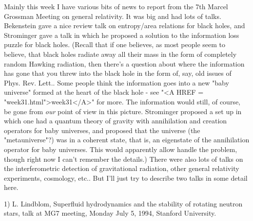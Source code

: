 

Mainly this week I have various bits of news to report from the
7th Marcel Grossman Meeting on general relativity.   It was big
and had lots of talks.  Bekenstein gave a nice review talk on
entropy/area relations for black holes, and Strominger gave a 
talk in which he proposed a solution to the information loss
puzzle for black holes.  (Recall that if one believes, as most people
seem to believe, that black holes radiate away all their mass in the
form of completely random Hawking radiation, then there's a question
about where the information has gone that you threw into the black hole
in the form of, say, old issues of Phys. Rev. Lett..  Some people
think the information goes into a new "baby universe" formed at the
heart of the black hole - see "<A HREF = "week31.html">week31</A>" for more.  The information
would still, of course, be gone from \emph{our} point of view in this
picture.  Strominger proposed a set up in which one had a quantum theory
of gravity with annihilation and creation operators for baby universes,
and proposed that the universe (the "metauniverse"?) was in a coherent
state, that is, an eigenstate of the annihilation operator for baby
universes.  This would apparently allow handle the problem, though right
now I can't remember the details.)  There were also lots of talks on the
interferometric detection of gravitational radiation, other general
relativity experiments, cosmology, etc..  But I'll just try to describe
two talks in some detail here.

1) L. Lindblom, Superfluid hydrodynamics and the stability of
rotating neutron stars, talk at MG7 meeting, Monday July 5, 1994,
Stanford University.

